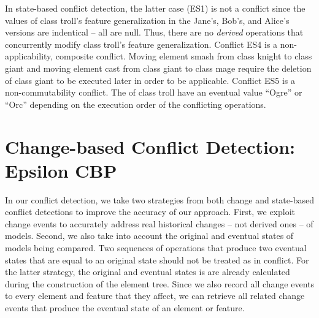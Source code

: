 In state-based conflict detection, the latter case (ES1) is not a conflict since the values of class \textsf{troll}'s feature \textsf{generalization} in the Jane's, Bob's, and Alice's versions are indentical -- all are null. Thus, there are no \textit{derived} operations that concurrently modify class \textsf{troll}'s feature \textsf{generalization}. Conflict ES4 is a non-applicability, composite conflict. Moving element \textsf{smash} from class \textsf{knight} to class \textsf{giant} and moving element \textsf{cast} from class \textsf{giant} to class \textsf{mage} require the deletion of class \textsf{giant} to be executed later in order to be applicable. Conflict ES5 is a non-commutability conflict. The  of class \textsf{troll} have an eventual value ``Ogre'' or ``Orc'' depending on the execution order of the conflicting operations.

%
%
%

\section{Change-based Conflict Detection: Epsilon CBP}
\label{change_based_conflict_detection_epsilon_cbp}

In our conflict detection, we take two strategies from both change and state-based conflict detections to improve the accuracy of our approach. 
First, we exploit change events to accurately address real historical changes -- not derived ones -- of models. 
Second, we also take into account the original and eventual states of models being compared. 
Two sequences of operations that produce two eventual states that are equal to an original state should not be treated as in conflict. 
For the latter strategy, the original and eventual states is are already calculated during the construction of the \textsf{element tree}.
Since we also record all change events to every element and feature that they affect, 
we can retrieve all related change events that produce the eventual state of an element or feature. 

